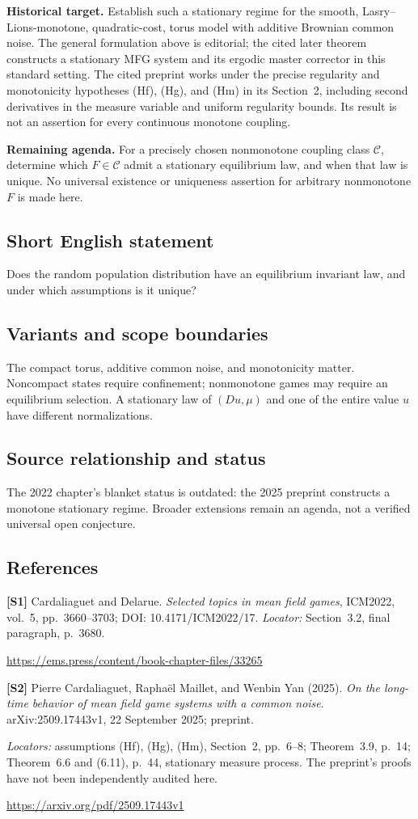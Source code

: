 \documentclass[11pt,a4paper]{article}
\begin{document}
\textbf{Historical target.} Establish such a stationary regime for the smooth, Lasry--Lions-monotone, quadratic-cost, torus model with additive Brownian common noise. The general formulation above is editorial; the cited later theorem constructs a stationary MFG system and its ergodic master corrector in this standard setting. The cited preprint works under the precise regularity and monotonicity hypotheses (Hf), (Hg), and (Hm) in its Section~2, including second derivatives in the measure variable and uniform regularity bounds. Its result is not an assertion for every continuous monotone coupling.

\textbf{Remaining agenda.} For a precisely chosen nonmonotone coupling class $\mathcal C$, determine which $F\in\mathcal C$ admit a stationary equilibrium law, and when that law is unique. No universal existence or uniqueness assertion for arbitrary nonmonotone $F$ is made here.
\subsection*{Short English statement}
Does the random population distribution have an equilibrium invariant law, and under which assumptions is it unique?
\subsection*{Variants and scope boundaries}
The compact torus, additive common noise, and monotonicity matter. Noncompact states require confinement; nonmonotone games may require an equilibrium selection. A stationary law of $(Du,\mu)$ and one of the entire value $u$ have different normalizations.
\subsection*{Source relationship and status}
The 2022 chapter's blanket status is outdated: the 2025 preprint constructs a monotone stationary regime. Broader extensions remain an agenda, not a verified universal open conjecture.
\subsection*{References}
\begingroup\footnotesize\raggedright
{\footnotesize\raggedright
\textbf{[S1]} Cardaliaguet and Delarue. \emph{Selected topics in mean field games}, ICM2022, vol.~5, pp.~3660--3703; DOI: 10.4171/ICM2022/17. \textit{Locator:} Section~3.2, final paragraph, p.~3680.\par
\url{https://ems.press/content/book-chapter-files/33265}\par\smallskip
\textbf{[S2]} Pierre Cardaliaguet, Rapha\"el Maillet, and Wenbin Yan (2025). \emph{On the long-time behavior of mean field game systems with a common noise}. arXiv:2509.17443v1, 22 September 2025; preprint.\par
\textit{Locators:} assumptions (Hf), (Hg), (Hm), Section~2, pp.~6--8; Theorem~3.9, p.~14; Theorem~6.6 and (6.11), p.~44, stationary measure process. The preprint's proofs have not been independently audited here.\par
\url{https://arxiv.org/pdf/2509.17443v1}\par}
\par\endgroup
\end{document}
